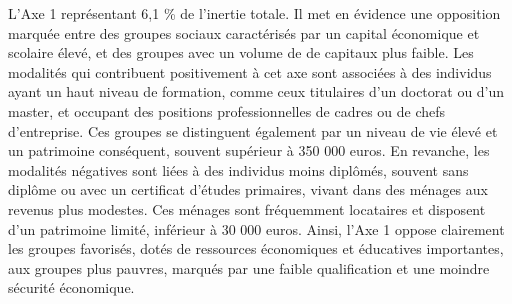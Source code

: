 \documentclass[
  12pt,
]{book}
\begin{document}
L'Axe 1 représentant 6,1 \% de l'inertie totale. Il met en évidence une
opposition marquée entre des groupes sociaux caractérisés par un capital
économique et scolaire élevé, et des groupes avec un volume de de
capitaux plus faible. Les modalités qui contribuent positivement à cet
axe sont associées à des individus ayant un haut niveau de formation,
comme ceux titulaires d'un doctorat ou d'un master, et occupant des
positions professionnelles de cadres ou de chefs d'entreprise. Ces
groupes se distinguent également par un niveau de vie élevé et un
patrimoine conséquent, souvent supérieur à 350 000 euros. En revanche,
les modalités négatives sont liées à des individus moins diplômés,
souvent sans diplôme ou avec un certificat d'études primaires, vivant
dans des ménages aux revenus plus modestes. Ces ménages sont fréquemment
locataires et disposent d'un patrimoine limité, inférieur à 30 000
euros. Ainsi, l'Axe 1 oppose clairement les groupes favorisés, dotés de
ressources économiques et éducatives importantes, aux groupes plus
pauvres, marqués par une faible qualification et une moindre sécurité
économique.

\begingroup\fontsize{7}{9}\selectfont
\end{document}

